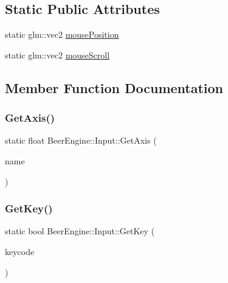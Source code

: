 \subsection*{Static Public Attributes}
\begin{DoxyCompactItemize}
\item 
static glm\+::vec2 \mbox{\hyperlink{class_beer_engine_1_1_input_ae232daf7243afe948422d0b3bb14d2d2}{mouse\+Position}}
\item 
static glm\+::vec2 \mbox{\hyperlink{class_beer_engine_1_1_input_aaba670f7f093d65462f47cb46f8810bc}{mouse\+Scroll}}
\end{DoxyCompactItemize}


\subsection{Member Function Documentation}
\mbox{\label{class_beer_engine_1_1_input_ac21c03c4b7d417941034e935af481f2c}} 
\subsubsection{\texorpdfstring{Get\+Axis()}{GetAxis()}}
{\footnotesize\ttfamily static float Beer\+Engine\+::\+Input\+::\+Get\+Axis (\begin{DoxyParamCaption}\item[{std\+::string}]{name }\end{DoxyParamCaption})\hspace{0.3cm}{\ttfamily [static]}}

\mbox{\label{class_beer_engine_1_1_input_aef391d62eeafff68a8b33d232e38c324}} 
\subsubsection{\texorpdfstring{Get\+Key()}{GetKey()}}
{\footnotesize\ttfamily static bool Beer\+Engine\+::\+Input\+::\+Get\+Key (\begin{DoxyParamCaption}\item[{\mbox{\hyperlink{namespace_beer_engine_a94f0b552f6dc910de8cdb44207981f53}{Key\+Code}}}]{keycode }\end{DoxyParamCaption})\hspace{0.3cm}{\ttfamily [static]}}

